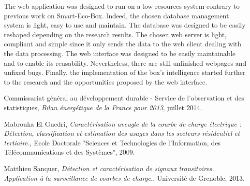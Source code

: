 The web application was designed to run on a low resources system contrary to previous work on Smart-Eco-Box. Indeed, the chosen database management system is light, easy to use and maintain. The database was designed to be easily reshaped depending on the research results. The chosen web server is light, compliant and simple since it only sends the data to the web client dealing with the data processing. The web interface was designed to be easily maintainable and to enable its reusability. Nevertheless, there are still unfinished webpages and unfixed bugs. Finally, the implementation of the box's intelligence started further to the research and the opportunities proposed by the web interface.



\begin{thebibliography}{10}
 Commissariat g\'en\'eral au d\'eveloppement durable - Service de l'observation et des statistiques, \emph{Bilan \'energ\'etique de la France pour 2013}, juillet 2014.
 
    Mabrouka El Guedri, \emph{Caract\'erisation aveugle de la courbe de charge \'electrique : D\'etection, classification et estimation des usages dans les secteurs r\'esidentiel et tertiaire.}, Ecole Doctorale "Sciences et Technologies de l'Information, des T\'el\'ecommunications et des Syst\`emes", 2009.
 
    Matthieu Sanquer, \textit{D\'etection et caract\'erisation de signaux transitoires. Application \`a la surveillance de courbes de charge.}, Universit\'e de Grenoble, 2013.
\end{thebibliography}